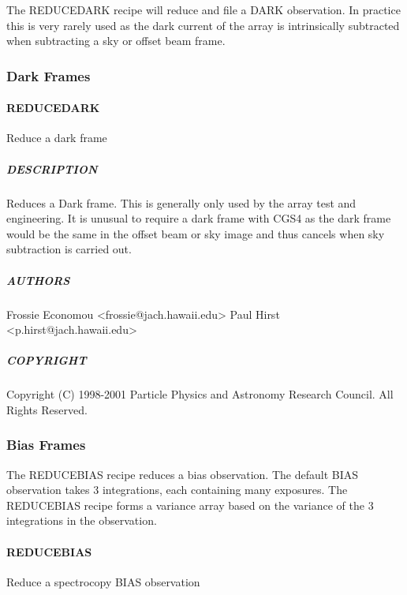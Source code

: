\documentclass[twoside,11pt]{article}
\renewcommand{\_}{\texttt{\symbol{95}}}
\begin{document}
The REDUCE\_DARK recipe will reduce and file a DARK observation. In
practice this is very rarely used as the dark current of the array is
intrinsically subtracted when subtracting a sky or offset beam frame.

\subsubsection{Dark Frames}


\paragraph*{REDUCE\_DARK\label{REDUCE_DARK}}

Reduce a dark frame

\subparagraph*{DESCRIPTION\label{REDUCE_DARK_DESCRIPTION}}

Reduces a Dark frame. This is generally only used by the array test
and engineering. It is unusual to require a dark frame with CGS4 as
the dark frame would be the same in the offset beam or sky image and
thus cancels when sky subtraction is carried out.

\subparagraph*{AUTHORS\label{REDUCE_DARK_AUTHORS}}

Frossie Economou <frossie@jach.hawaii.edu>
Paul Hirst <p.hirst@jach.hawaii.edu>

\subparagraph*{COPYRIGHT\label{REDUCE_DARK_COPYRIGHT}}

Copyright (C) 1998-2001 Particle Physics and Astronomy Research
Council. All Rights Reserved.


\subsubsection{Bias Frames}

The REDUCE\_BIAS recipe reduces a bias observation. The default BIAS
observation takes 3 integrations, each containing many exposures. The
REDUCE\_BIAS recipe forms a variance array based on the variance of the
3 integrations in the observation.


\paragraph*{REDUCE\_BIAS\label{REDUCE_BIAS}}

Reduce a spectrocopy BIAS observation
\end{document}
